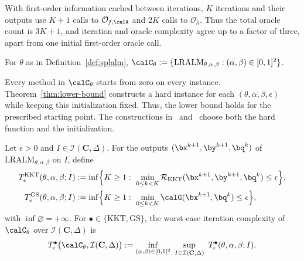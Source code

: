 With first-order information cached between iterations, \(K\) iterations and
their outputs use \(K+1\) calls to \(\mathcal O_{f,\calA}\) and \(2K\) calls to
\(\mathcal O_h\). Thus the total oracle count is \(3K+1\), and iteration
and oracle complexity agree up to a factor of three, apart from one initial
first-order oracle call.

\begin{definition}
\label{def:algorithm-family}
For \(\theta\) as in Definition~\ref{def:splalm},
\(\calC_\theta:=\{\mathrm{LRALM}_{\theta,\alpha,\beta}:(\alpha,\beta)\in[0,1]^2\}\).
\end{definition}

\begin{remark}[Initialization]
\label{rem:lb-initialization}
Every method in \(\calC_\theta\) starts from zero on every instance.
Theorem~\ref{thm:lower-bound} constructs a hard instance for each
\((\theta,\alpha,\beta,\epsilon)\) while keeping this initialization fixed.
Thus, the lower bound holds for the prescribed starting point.
The constructions in~\cite[Section~5.1.1]{li2026smoothing}
and~\cite[Appendix~C.1]{mahdavinia2022tight} choose both the hard function
and the initialization.
\end{remark}

\begin{definition}
\label{def:complexity-measure}
Let \(\epsilon>0\) and \(I\in\mathcal I(\mathbf C,\Delta)\).
For the outputs \((\bx^{k+1},\by^{k+1},\bq^k)\) of
\(\mathrm{LRALM}_{\theta,\alpha,\beta}\) on \(I\), define
\[
\begin{aligned}
    T^{\mathrm{KKT}}_\epsilon(\theta,\alpha,\beta;I)
    &:=\inf\Bigl\{K\ge1:\ \min_{0\le k<K}
        \mathcal R_{\mathrm{KKT}}(\bx^{k+1},\by^{k+1},\bq^k)\le\epsilon\Bigr\},\\
    T^{\mathrm{GS}}_\epsilon(\theta,\alpha,\beta;I)
    &:=\inf\Bigl\{K\ge1:\ \min_{0\le k<K}
        \calG(\bx^{k+1},\bq^k)\le\epsilon\Bigr\},
\end{aligned}
\]
with \(\inf\varnothing=+\infty\). For \(\bullet\in\{\mathrm{KKT},\mathrm{GS}\}\),
the worst-case iteration complexity of \(\calC_\theta\) over
\(\mathcal I(\mathbf C,\Delta)\) is
\[
    T^{\bullet}_\epsilon\bigl(\calC_\theta,\mathcal I(\mathbf C,\Delta)\bigr)
    :=\inf_{(\alpha,\beta)\in[0,1]^2}\
    \sup_{I\in\mathcal I(\mathbf C,\Delta)}\
    T^{\bullet}_\epsilon(\theta,\alpha,\beta;I).
\]
\end{definition}

